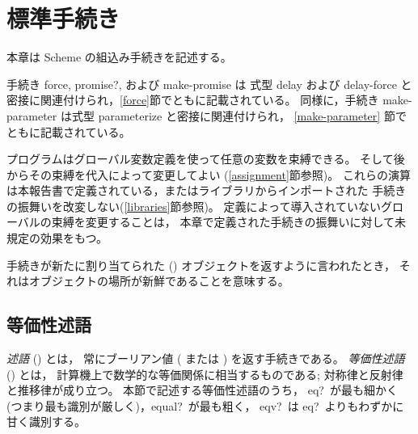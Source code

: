 
\chapter{標準手続き}
\label{initialenv}
\label{builtinchapter}


本章は Scheme の組込み手続きを記述する。

手続き {\cf force}, {\cf promise?}, および {\cf make-promise} は
式型 {\cf delay} および {\cf delay-force} と密接に関連付けられ，\ref{force}節でともに記載されている。
同様に，手続き {\cf make-parameter} は式型 {\cf parameterize} と密接に関連付けられ，
\ref{make-parameter} 節でともに記載されている。

プログラムはグローバル変数定義を使って任意の変数を束縛できる。
そして後からその束縛を代入によって変更してよい (\ref{assignment}節参照)。
これらの演算は本報告書で定義されている，またはライブラリからインポートされた
手続きの振舞いを改変しない(\ref{libraries}節参照)。
定義によって導入されていないグローバルの束縛を変更することは，
本章で定義された手続きの振舞いに対して未規定の効果をもつ。

手続きが新たに割り当てられた () オブジェクトを返すように言われたとき，
それはオブジェクトの場所が新鮮であることを意味する。

\section{等価性述語}
\label{equivalencesection}

{\em 述語} (\/) とは，
常にブーリアン値 (\schtrue{} または \schfalse) を返す手続きである。
{\em 等価性述語} (\/) とは，
計算機上で数学的な等価関係に相当するものである; 対称律と反射律と推移律が成り立つ。
本節で記述する等価性述語のうち，
{\cf eq?}\ が最も細かく (つまり最も識別が厳しく)，{\cf equal?}\ が最も粗く，
{\cf eqv?}\ は {\cf eq?}\ よりもわずかに甘く識別する。


